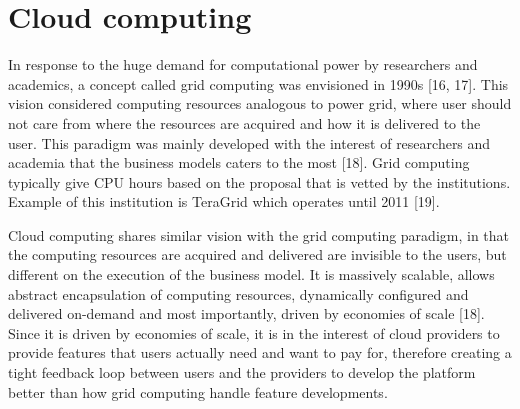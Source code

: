 %



\section{Cloud computing}

In response to the huge demand for computational power by researchers and academics, a concept called grid computing was envisioned in 1990s [16, 17]. This vision considered computing resources analogous to power grid, where user should not care from where the resources are acquired and how it is delivered to the user. This paradigm was mainly developed with the interest of researchers and academia that the business models caters to the most [18]. Grid computing typically give CPU hours based on the proposal that is vetted by the institutions. Example of this institution is TeraGrid which operates until 2011 [19].

Cloud computing shares similar vision with the grid computing paradigm, in that the computing resources are acquired and delivered are invisible to the users, but different on the execution of the business model. It is massively scalable, allows abstract encapsulation of computing resources, dynamically configured and delivered on-demand and most importantly, driven by economies of scale [18]. Since it is driven by economies of scale, it is in the interest of cloud providers to provide features that users actually need and want to pay for, therefore creating a tight feedback loop between users and the providers to develop the platform better than how grid computing handle feature developments.


